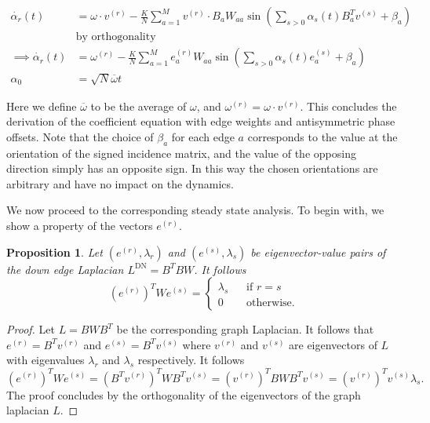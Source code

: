 \documentclass[%
 aip,
 amsmath,amssymb,
preprint,
reprint, onecolumn %
]{revtex4-1}
\newtheorem{prop}[theorem]{Proposition}
\begin{document}
    \begin{align*}
        \dot{\alpha_r}(t)&=\omega\cdot v^{(r)}-\frac{K}{N}\sum_{a=1}^M v^{(r)}\cdot B_{a} W_{aa} \sin\left(\sum_{s>0} \alpha_s(t) B_a^T v^{(s)} + \beta_a\right)\\
        &\text{by orthogonality}\\
        \implies \dot{\alpha_r}(t)&=\omega^{(r)}-\frac{K}{N}\sum_{a=1}^M e^{(r)}_a W_{aa} \sin\left(\sum_{s>0} \alpha_s(t) e_a^{(s)} + \beta_a\right)\\
        \alpha_0 &= \sqrt{N} \overline{\omega} t
    \end{align*}
    
    Here we define $\overline{\omega}$ to be the average of $\omega$, and $\omega^{(r)}=\omega\cdot v^{(r)}$. This concludes the derivation of the coefficient equation with edge weights and antisymmetric phase offsets. Note that the choice of $\beta_a$ for each edge $a$ corresponds to the value at the orientation of the signed incidence matrix, and the value of the opposing direction simply has an opposite sign. In this way the chosen orientations are arbitrary and have no impact on the dynamics.
    
    We now proceed to the corresponding steady state analysis. To begin with, we show a property of the vectors $e^{(r)}$. 
    
    \begin{prop}
        Let $(e^{(r)}, \lambda_r)$ and $(e^{(s)},\lambda_s)$ be eigenvector-value pairs of the down edge Laplacian $L^\text{DN}=B^TBW$. It follows 
        \[   (e^{(r)})^T W e^{(s)}=
        \begin{cases} 
          \lambda_s & \hspace{10pt} \text{if $r=s$}\\
          0     &\hspace{10pt}   \text{otherwise.}
       \end{cases}
        \]
    \end{prop}
    \begin{proof}
        Let $L=BWB^T$ be the corresponding graph Laplacian. It follows that $e^{(r)}=B^Tv^{(r)}$ and $e^{(s)}=B^Tv^{(s)}$ where $v^{(r)}$ and $v^{(s)}$ are eigenvectors of $L$ with eigenvalues $\lambda_r$ and $\lambda_s$ respectively. It follows
        \[
        (e^{(r)})^T W e^{(s)}=(B^Tv^{(r)})^T W B^Tv^{(s)}=(v^{(r)})^T BWB^Tv^{(s)}=(v^{(r)})^T v^{(s)}\lambda_s.
        \]
    The proof concludes by the orthogonality of the eigenvectors of the graph laplacian $L$.
    \end{proof}
    
\end{document}
